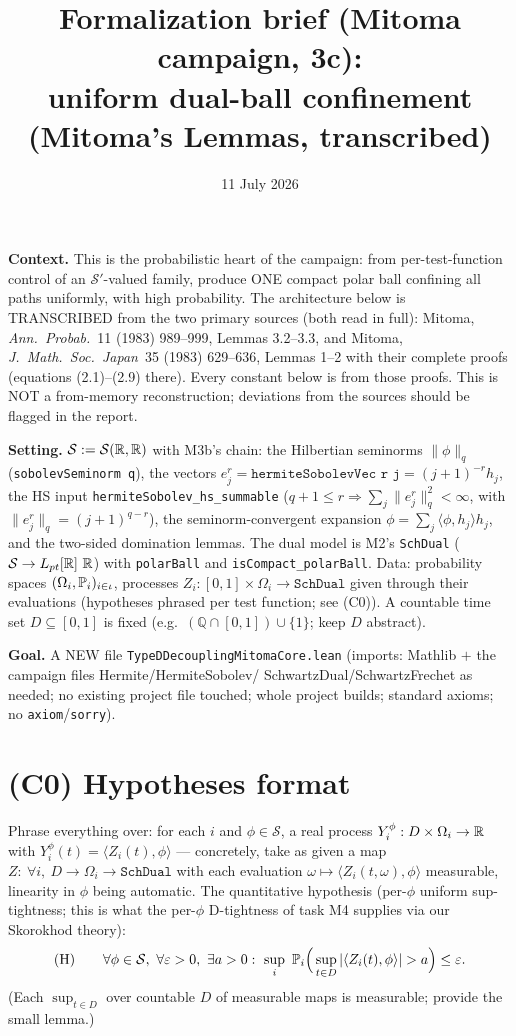 \documentclass[11pt]{article}
\title{Formalization brief (Mitoma campaign, 3c):\\
uniform dual-ball confinement (Mitoma's Lemmas, transcribed)}
\date{11 July 2026}
\theoremstyle{plain}
\theoremstyle{remark}
\newcommand{\eps}{\varepsilon}\newcommand{\Sch}{\mathcal{S}}
\newcommand{\ip}[2]{\langle #1,#2\rangle}
\begin{document}
\maketitle

\noindent\textbf{Context.} This is the probabilistic heart of the
campaign: from per-test-function control of an $\Sch'$-valued family,
produce ONE compact polar ball confining all paths uniformly, with high
probability. The architecture below is TRANSCRIBED from the two primary
sources (both read in full): Mitoma, \emph{Ann.\ Probab.}~11 (1983)
989--999, Lemmas 3.2--3.3, and Mitoma, \emph{J.\ Math.\ Soc.\ Japan}~35
(1983) 629--636, Lemmas 1--2 with their complete proofs (equations
(2.1)--(2.9) there). Every constant below is from those proofs. This is
NOT a from-memory reconstruction; deviations from the sources should be
flagged in the report.

\medskip
\noindent\textbf{Setting.} $\Sch:=\Sch(\R,\R)$ with M3b's chain: the
Hilbertian seminorms $\|\phi\|_q$ (\texttt{sobolevSeminorm q}), the
vectors $e^r_j=\texttt{hermiteSobolevVec r j}=(j+1)^{-r}h_j$, the HS
input \texttt{hermiteSobolev\_hs\_summable} ($q+1\le r\Rightarrow
\sum_j\|e^r_j\|_q^2<\infty$, with $\|e_j^r\|_q=(j+1)^{q-r}$), the
seminorm-convergent expansion $\phi=\sum_j\ip{\phi}{h_j}h_j$, and the
two-sided domination lemmas. The dual model is M2's \texttt{SchDual}
($\Sch\to L_{pt}[\R]\ \R$) with \texttt{polarBall} and
\texttt{isCompact\_polarBall}. Data: probability spaces
$(\Omega_i,\mathbb{P}_i)_{i\in\iota}$, processes
$Z_i:[0,1]\times\Omega_i\to\texttt{SchDual}$ given through their
evaluations (hypotheses phrased per test function; see (C0)). A countable
time set $D\subseteq[0,1]$ is fixed (e.g.\ $(\mathbb Q\cap[0,1])\cup\{1\}$;
keep $D$ abstract).

\medskip
\noindent\textbf{Goal.} A NEW file \texttt{TypeDDecouplingMitomaCore.lean}
(imports: Mathlib $+$ the campaign files Hermite/HermiteSobolev/%
SchwartzDual/SchwartzFrechet as needed; no existing project file touched;
whole project builds; standard axioms; no \texttt{axiom}/\texttt{sorry}).

\section*{(C0) Hypotheses format}

Phrase everything over: for each $i$ and $\phi\in\Sch$, a real process
$Y_i^\phi:D\times\Omega_i\to\mathbb{R}$ with $Y_i^\phi(t)=\ip{Z_i(t)}{\phi}$
--- concretely, take as given a map
$Z:\ \forall i,\ D\to\Omega_i\to\texttt{SchDual}$ with each evaluation
$\omega\mapsto\ip{Z_i(t,\omega)}{\phi}$ measurable, linearity in $\phi$
being automatic. The quantitative hypothesis (per-$\phi$ uniform
sup-tightness; this is what the per-$\phi$ D-tightness of task M4
supplies via our Skorokhod theory):
\[
(\mathrm H)\qquad\forall\phi\in\Sch,\ \forall\eps>0,\ \exists a>0:\
\sup_i\ \PP_i\Big(\sup_{t\in D}|\ip{Z_i(t)}{\phi}|>a\Big)\le\eps .
\]
(Each $\sup_{t\in D}$ over countable $D$ of measurable maps is
measurable; provide the small lemma.)
\end{document}
